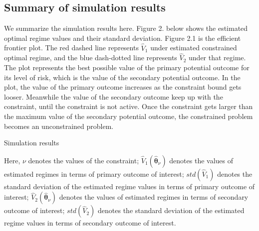 \documentclass{article}
\newcommand{\wh}{\widehat}
\newcommand{\bs}{ \boldsymbol}
\begin{document}
\subsection{Summary of simulation results}
We summarize the simulation results here. Figure 2. below shows the estimated optimal regime values and their standard deviation. Figure 2.1 is the efficient frontier plot. The red dashed line represents $\wh{V}_1$ under estimated constrained optimal regime, and the blue dash-dotted line represents $\wh{V}_2$ under that regime. The plot represents the best possible value of the primary potential outcome for its level of risk, which is the value of the secondary potential outcome. In the plot, the value of the primary outcome increases as the constraint bound gets looser. Meanwhile the value of the secondary outcome keep up with the constraint, until the constraint is not active. Once the constraint gets larger than the maximum value of the secondary potential outcome, the constrained problem becomes an unconstrained problem. \\
\begin{center}
\begin{table}[!htbp]
\caption{Simulation results}
	\centering
{\tt
	
}
\justify
Here, $\nu$ denotes the values of the constraint; $\wh{V}_1(\wh{\bs{\theta}}_{\nu})$ denotes the values of estimated regimes in terms of primary outcome of interest; $std(\wh{V}_1)$ denotes the standard deviation of the estimated regime values in terms of primary outcome of interest; $\wh{V}_2(\wh{\bs{\theta}}_{\nu})$ denotes the values of estimated regimes in terms of secondary outcome of interest; $std(\wh{V}_2)$ denotes the standard deviation of the estimated regime values in terms of secondary outcome of interest.
\end{table}
\end{center}
\end{document}
